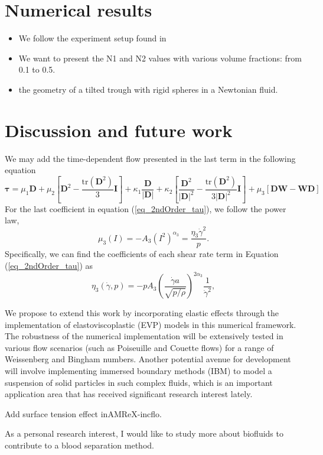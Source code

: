 \section{Numerical results}
\begin{itemize}
  \item We follow the experiment setup found in \cite{couturier_suspensions_2011}
  \item We want to present the N1 and N2 values with various volume fractions: from 0.1 to 0.5.
  \item the geometry of a tilted trough with rigid spheres in a Newtonian fluid. 
\end{itemize}

\section{Discussion and future work}
We may add the time-dependent flow presented in the last term in the following equation
\begin{equation}
  \bm{\tau} =  \mu_1 {\bm D} 
    + \mu_2  \left[ {\bm D}^2  - \frac{\text{tr}\left({\bm D}^2\right)}{3}{\bm I} \right]
   + \kappa_1 \frac{{\bm D}}{|{\bm D}|} 
    + \kappa_2  \left[ \frac{{\bm D}^2}{|{\bm D}|^2}  
    - \frac{\text{tr}\left({\bm D}^2\right)}{3|{\bm D}|^2}{\bm I} \right]
    + \mu_3  \left[ {\bm D}{\bm W} - {\bm W}{\bm D} \right]
  \end{equation}
  For the last coefficient in equation (\ref{eq_2ndOrder_tau}), we follow the power law, 
\begin{equation}
    \mu_3(I) = -A_3 \left( I^2 \right)^{\alpha_3} = \frac{\eta_3 \dot{\gamma}^2}{p}.
\label{eq_muI3}
\end{equation}
Specifically, we can find the coefficients of each shear rate term in Equation (\ref{eq_2ndOrder_tau}) as
\begin{equation}
     \eta_3 (\dot{\gamma}, p) = 
    -p A_3 
        \left( \frac{\dot{\gamma} a }{\sqrt{p/\rho}}  \right)^{2\alpha_3} 
        \frac{1}{\dot{\gamma}^2},
\label{eq_gr_eta_3}
\end{equation}
\par
We propose to extend this work by incorporating elastic effects through the implementation of elastoviscoplastic (EVP) models in this numerical framework. The robustness of the numerical implementation will be extensively tested in various flow scenarios (such as Poiseuille and Couette flows) for a range of Weissenberg and Bingham numbers.  Another potential avenue for development will involve implementing immersed boundary methods (IBM) to model a suspension of solid particles in such complex fluids, which is an important application area that has received significant research interest lately. 
\par
Add surface tension effect inAMReX-incflo. 
\par 
As a personal research interest, I would like to study more about biofluids to contribute to a blood separation method. 
